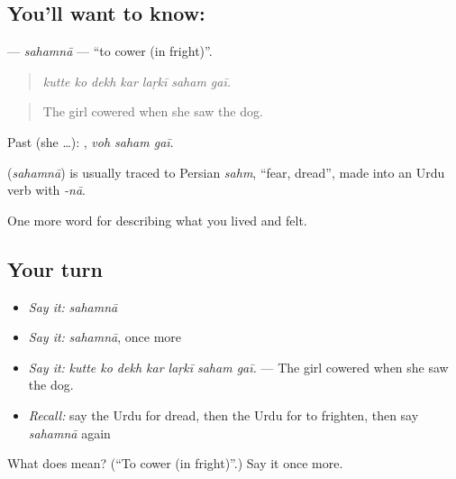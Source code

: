 \subsection*{You'll want to know: }
\textbf{} — \emph{sahamnā} — \textquotedblleft{}to cower (in fright)\textquotedblright{}.

\begin{quote}
      
\end{quote}

\begin{quote}
\emph{kutte ko dekh kar laṛkī saham gaī.}
\end{quote}

\begin{quote}
The girl cowered when she saw the dog.
\end{quote}

Past (she …):   , \emph{voh saham gaī}.

\begin{cousinweb}
\textbf{} (\emph{sahamnā}) is usually traced to Persian \emph{sahm}, \textquotedblleft{}fear, dread\textquotedblright{}, made into an Urdu verb with \emph{-nā}.
\end{cousinweb}

\begin{grammarlens}[title={What you've built}]
One more word for describing what you lived and felt.
\end{grammarlens}

\subsection*{Your turn}
\begin{itemize}
\raggedright
  \item \emph{Say it:} \emph{sahamnā}
  \item \emph{Say it:} \emph{sahamnā}, once more
  \item \emph{Say it:} \emph{kutte ko dekh kar laṛkī saham gaī.} — The girl cowered when she saw the dog.
  \item \emph{Recall:} say the Urdu for dread, then the Urdu for to frighten, then say \emph{sahamnā} again
\end{itemize}

\begin{tcolorbox}[breakable,colback=teal!4,colframe=teal!35!black,title={Before you move on}]
What does  mean? (\textquotedblleft{}To cower (in fright)\textquotedblright{}.) Say it once more.
\end{tcolorbox}
